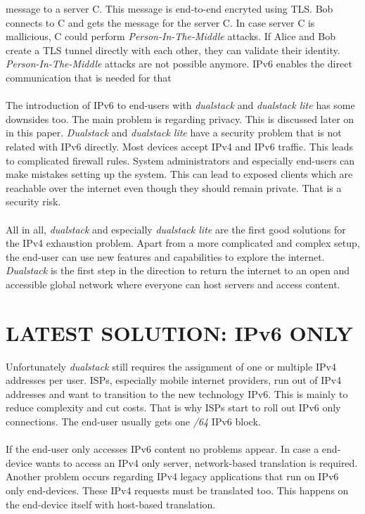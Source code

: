 \documentclass[format=sigconf, natbib=true, nonacm=true]{acmart}
\begin{document}
message to a server C. This message is end-to-end encryted using TLS. Bob connects to C and gets the message for the server C. In case server C is mallicious, C could perform \textit{Person-In-The-Middle} attacks. If Alice and Bob create a TLS tunnel directly with each other, they can validate their identity. \textit{Person-In-The-Middle} attacks are not possible anymore. IPv6 enables the direct communication that is needed for that\\\\The introduction of IPv6 to end-users with \textit{dualstack} and \textit{dualstack lite} has some downsides too. The main problem is regarding privacy. This is discussed later on in this paper. \textit{Dualstack} and \textit{dualstack lite} have a security problem that is not related with IPv6 directly. Most devices accept IPv4 and IPv6 traffic. This leads to complicated firewall rules. System administrators and especially end-users can make mistakes setting up the system. This can lead to exposed clients which are reachable over the internet even though they should remain private. That is a security risk.\\\\All in all, \textit{dualstack} and especially \textit{dualstack lite} are the first good solutions for the IPv4 exhaustion problem. Apart from a more complicated and complex setup, the end-user can use new features and capabilities to explore the internet. \textit{Dualstack} is the first step in the direction to return the internet to an open and accessible global network where everyone can host servers and access content.
    \section{LATEST SOLUTION: IPv6 ONLY}
    Unfortunately \textit{dualstack} still requires the assignment of one or multiple IPv4 addresses per user. ISPs, especially mobile internet providers, run out of IPv4 addresses and want to transition to the new technology IPv6. This is mainly to reduce complexity and cut costs. That is why ISPs start to roll out IPv6 only connections. The end-user usually gets one \textit{/64} IPv6 block.\\\\If the end-user only accesses IPv6 content no problems appear. In case a end-device wants to access an IPv4 only server, network-based translation is required. Another problem occurs regarding IPv4 legacy applications that run on IPv6 only end-devices. These IPv4 requests must be translated too. This happens on the end-device itself with host-based translation.
\end{document}
